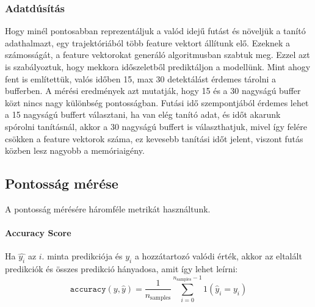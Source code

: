 \documentclass[acmtog, authorversion]{acmart}
\begin{document}
\subsubsection{Adatdúsítás}
Hogy minél pontosabban reprezentáljuk a valód idejű futást és növeljük a tanító adathalmazt, egy trajektóriából több feature vektort állítunk elő.
Ezeknek a számosságát, a feature vektorokat generáló algoritmusban szabtuk meg. Ezzel azt is szabályoztuk, hogy mekkora időszeletből prediktáljon
a modellünk. Mint ahogy fent is említettük, valós időben 15, max 30 detektálást érdemes tárolni a bufferben. A mérési eredmények azt mutatják, hogy
15 és a 30 nagyságú buffer közt nincs nagy különbség pontosságban. Futási idő szempontjából érdemes lehet a 15 nagyságú buffert választani,
ha van elég tanító adat, és időt akarunk spórolni tanításnál, akkor a 30 nagyságú buffert is választhatjuk, mivel így felére csökken a feature vektorok száma, ez kevesebb tanítási időt jelent, viszont futás közben lesz nagyobb a memóriaigény.
\subsection{Pontosság mérése}
A pontosság mérésére háromféle metrikát használtunk.
\paragraph{Accuracy Score}
Ha \begin{math}\hat{y_i}\end{math} az \begin{math}i\end{math}. minta predikciója és \begin{math}y_i\end{math} a hozzátartozó valódi érték,
akkor az eltalált predikciók és összes predikció hányadosa, amit így lehet leírni:\break
\begin{equation}
\texttt{accuracy}(y, \hat{y}) = \frac{1}{n_\text{samples}} \sum_{i=0}^{n_\text{samples}-1} 1(\hat{y}_i = y_i)
\end{equation}
\end{document}
